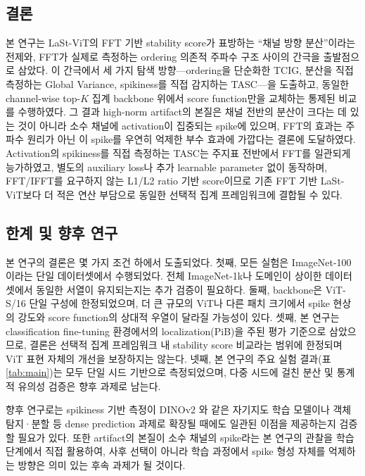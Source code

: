 \documentclass[10pt,twocolumn,letterpaper]{article}
\begin{document}
\subsection{결론}

본 연구는 LaSt-ViT의 FFT 기반 stability score가 표방하는 ``채널 방향 분산''이라는 전제와, FFT가 실제로 측정하는 ordering 의존적 주파수 구조 사이의 간극을 출발점으로 삼았다. 이 간극에서 세 가지 탐색 방향---ordering을 단순화한 TCIG, 분산을 직접 측정하는 Global Variance, spikiness를 직접 감지하는 TASC---을 도출하고, 동일한 channel-wise top-$K$ 집계 backbone 위에서 score function만을 교체하는 통제된 비교를 수행하였다. 그 결과 high-norm artifact의 본질은 채널 전반의 분산이 크다는 데 있는 것이 아니라 소수 채널에 activation이 집중되는 spike에 있으며, FFT의 효과는 주파수 원리가 아닌 이 spike를 우연히 억제한 부수 효과에 가깝다는 결론에 도달하였다. Activation의 spikiness를 직접 측정하는 TASC는 주지표 전반에서 FFT를 일관되게 능가하였고, 별도의 auxiliary loss나 추가 learnable parameter 없이 동작하며, FFT/IFFT를 요구하지 않는 L1/L2 ratio 기반 score이므로 기존 FFT 기반 LaSt-ViT보다 더 적은 연산 부담으로 동일한 선택적 집계 프레임워크에 결합될 수 있다.

\subsection{한계 및 향후 연구}

본 연구의 결론은 몇 가지 조건 하에서 도출되었다. 첫째, 모든 실험은 ImageNet-100이라는 단일 데이터셋에서 수행되었다. 전체 ImageNet-1k나 도메인이 상이한 데이터셋에서 동일한 서열이 유지되는지는 추가 검증이 필요하다. 둘째, backbone은 ViT-S/16 단일 구성에 한정되었으며, 더 큰 규모의 ViT나 다른 패치 크기에서 spike 현상의 강도와 score function의 상대적 우열이 달라질 가능성이 있다. 셋째, 본 연구는 classification fine-tuning 환경에서의 localization(PiB)을 주된 평가 기준으로 삼았으므로, 결론은 선택적 집계 프레임워크 내 stability score 비교라는 범위에 한정되며 ViT 표현 자체의 개선을 보장하지는 않는다. 넷째, 본 연구의 주요 실험 결과(표 \ref{tab:main})는 모두 단일 시드 기반으로 측정되었으며, 다중 시드에 걸친 분산 및 통계적 유의성 검증은 향후 과제로 남는다.

향후 연구로는 spikiness 기반 측정이 DINOv2 \cite{oquab2024}와 같은 자기지도 학습 모델이나 객체 탐지·분할 등 dense prediction 과제로 확장될 때에도 일관된 이점을 제공하는지 검증할 필요가 있다. 또한 artifact의 본질이 소수 채널의 spike라는 본 연구의 관찰을 학습 단계에서 직접 활용하여, 사후 선택이 아니라 학습 과정에서 spike 형성 자체를 억제하는 방향은 의미 있는 후속 과제가 될 것이다.
\end{document}
